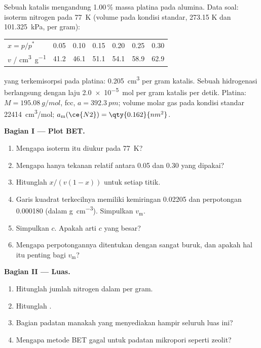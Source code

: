 \begin{problem}
\label{pb:b3:surfaces-catalysis:1}
Sebuah katalis mengandung 1.00\,\% massa platina pada alumina. Data soal:
isoterm nitrogen pada \qty{77}{K} (volume pada kondisi standar, 273.15 K dan
\qty{101.325}{kPa}, per gram):
\begin{center}\small
\begin{tabular}{lcccccc}
\hline
$x = p/p^*$ & 0.05 & 0.10 & 0.15 & 0.20 & 0.25 & 0.30 \\
$v$ / \unit{cm^3.g^{-1}} & 41.2 & 46.1 & 51.1 & 54.1 & 58.9 & 62.9 \\ \hline
\end{tabular}
\end{center}
 yang terkemisorpsi pada platina: \qty{0.205}{cm^3} per gram katalis. Sebuah hidrogenasi
berlangsung dengan laju \qty{2.0e-5}{mol} per gram katalis per detik. Platina: $M = \qty{195.08}{g/mol}$, fcc,
$a = \qty{392.3}{pm}$; volume molar gas pada kondisi standar \qty{22414}{cm^3/mol};
$a_{\mathrm m}(\ce{N2}) = \qty{0.162}{nm^2}$.

\medskip\noindent\textbf{Bagian I --- Plot BET.}
\begin{enumerate}[beginpenalty=10000]
  \item Mengapa isoterm itu diukur pada \qty{77}{K}?
  \item Mengapa hanya tekanan relatif antara 0.05 dan 0.30 yang dipakai?
  \item Hitunglah $x/(v(1 - x))$ untuk setiap titik.
  \item Garis kuadrat terkecilnya memiliki kemiringan \num{0.02205} dan perpotongan \num{0.000180} (dalam
        \unit{g.cm^{-3}}). Simpulkan $v_{\mathrm m}$.
  \item Simpulkan $c$. Apakah arti $c$ yang besar?
  \item Mengapa perpotongannya ditentukan dengan sangat buruk, dan apakah hal itu penting bagi $v_{\mathrm m}$?
\end{enumerate}

\medskip\noindent\textbf{Bagian II --- Luas.}
\begin{enumerate}[resume, beginpenalty=10000]
  \item Hitunglah jumlah nitrogen dalam  per gram.
  \item Hitunglah .
  \item Bagian padatan manakah yang menyediakan hampir seluruh luas ini?
  \item Mengapa metode BET gagal untuk padatan mikropori seperti zeolit?
\end{enumerate}


\end{problem}
